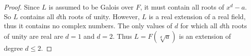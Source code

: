 \documentclass[10pt]{article}
\newcommand{\Q}{\mathbb{Q}}
\DeclareMathOperator*{\Gal}{Gal}
\begin{document}
\begin{enumerate}
\begin{proof}
Since $L$ is assumed to be Galois over $F$, it must contain all roots of $x^d - a$.  So $L$ contains all $d$th roots of unity.  However, $L$ is a real extension of a real field, thus it contains no complex numbers.  The only values of $d$ for which all $d$th roots of unity are real are $d=1$ and $d=2$.  Thus $L = F(\sqrt[d]{a})$ is an extension of degree $d \leq 2$.

\end{proof}










\end{enumerate}
\end{document}
